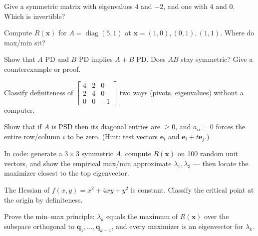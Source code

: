 \begin{exercise}[easy]
Give a symmetric matrix with eigenvalues $4$ and $-2$, and one with $4$
and $0$. Which is invertible?
\end{exercise}

\begin{exercise}[easy]
Compute $R(\mathbf x)$ for $A=\operatorname{diag}(5,1)$ at
$\mathbf x=(1,0),(0,1),(1,1)$. Where do max/min sit?
\end{exercise}

\begin{exercise}[medium]
Show that $A$ PD and $B$ PD implies $A+B$ PD. Does $AB$ stay symmetric?
Give a counterexample or proof.
\end{exercise}

\begin{exercise}[medium]
Classify definiteness of
$\begin{bmatrix}4&2&0\\2&4&0\\0&0&-1\end{bmatrix}$ two ways (pivots,
eigenvalues) without a computer.
\end{exercise}

\begin{exercise}[medium]
Show that if $A$ is PSD then its diagonal entries are $\ge0$, and
$a_{ii}=0$ forces the entire row/column $i$ to be zero. (Hint: test
vectors $\mathbf e_i$ and $\mathbf e_i+t\mathbf e_j$.)
\end{exercise}

\begin{exercise}[medium]
In code: generate a $3\times3$ symmetric $A$, compute $R(\mathbf x)$ on
100 random unit vectors, and show the empirical max/min approximate
$\lambda_1,\lambda_3$ --- then locate the maximizer closest to the top
eigenvector.
\end{exercise}

\begin{exercise}[medium]
The Hessian of $f(x,y)=x^{2}+4xy+y^{2}$ is constant. Classify the
critical point at the origin by definiteness.
\end{exercise}

\begin{exercise}[hard]
Prove the min--max principle: $\lambda_k$ equals the maximum of
$R(\mathbf x)$ over the subspace orthogonal to
$\mathbf q_1,\dots,\mathbf q_{k-1}$, and every maximizer is an
eigenvector for $\lambda_k$.
\end{exercise}

